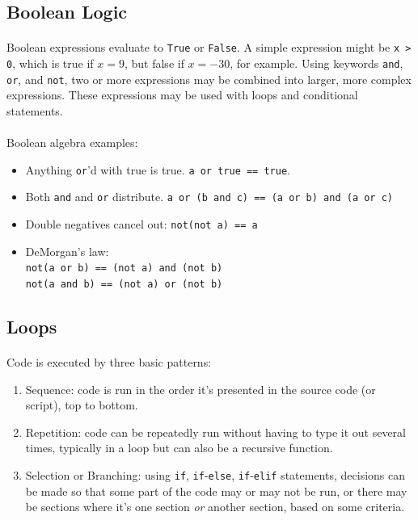 \documentclass[letter,10pt]{article}
\begin{document}
\subsection{Boolean Logic}
\paragraph{}Boolean expressions evaluate to \verb|True| or \verb|False|. A simple expression might be \verb|x > 0|, which is true if $x = 9$, but false if $x = -30$, for example. Using keywords \verb|and|, \verb|or|, and \verb|not|, two or more expressions may be combined into larger, more complex expressions. These expressions may be used with loops and conditional statements.

\paragraph{}Boolean algebra examples:
\begin{itemize}
    \item Anything \verb|or|'d with true is true. \verb|a or true == true|.
    \item Both \verb|and| and \verb|or| distribute. \verb|a or (b and c) == (a or b) and (a or c)|
    \item Double negatives cancel out: \verb|not(not a) == a|
    \item DeMorgan's law: \\
        \verb|not(a or b) == (not a) and (not b)| \\
        \verb|not(a and b) == (not a) or (not b)|
\end{itemize}

\subsection{Loops}
\paragraph{}Code is executed by three basic patterns:
\begin{enumerate}
    \item Sequence: code is run in the order it's presented in the source code (or script), top to bottom.
    \item Repetition: code can be repeatedly run without having to type it out several times, typically in a loop but can also be a recursive function.
    \item Selection or Branching: using \verb|if|, \verb|if|-\verb|else|, \verb|if|-\verb|elif| statements, decisions can be made so that some part of the code may or may not be run, or there may be sections where it's one section \textit{or} another section, based on some criteria.
\end{enumerate}
\end{document}
